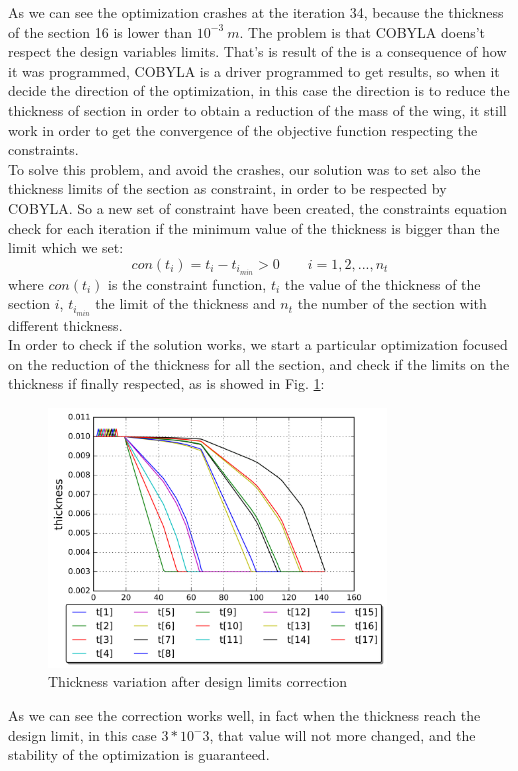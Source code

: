 As we can see the optimization crashes at the iteration 34, because the thickness of the section 16 is lower than $10^{-3}\ m$. The problem is that COBYLA doens't respect the design variables limits. That's is result of the is a consequence of how it was programmed, COBYLA is a driver programmed to get results, so when it decide the direction of the optimization, in this case the direction is to reduce the thickness of section in order to obtain a reduction of the mass of the wing, it still work in order to get the convergence of the objective function respecting the constraints. \\
To solve this problem, and avoid the crashes, our solution was to set also the thickness limits of the section as constraint, in order to be respected by COBYLA. So a new set of constraint have been created, the constraints equation check for each iteration if the minimum value of the thickness is bigger than the limit which we set:
\begin{equation*}
con(t_i)=t_i-t_{i_{min}} >0 \qquad i=1,2,...,n_t
\end{equation*}
where $con(t_i)$ is the constraint function, $t_i$ the value of the thickness of the section $i$, $t_{i_{min}}$ the limit of the thickness and $n_t$ the number of the section with different thickness.\\
In order to check if the solution works, we start a particular optimization focused on the reduction of the thickness for all the section, and check if the limits on the thickness if finally respected, as is showed in Fig. \ref{fig:5_10}:
 \begin{figure}[H]
	\centering
	\includegraphics[width = 0.8\textwidth]{./Immagini/5_11.png}
	\caption{Thickness variation after design limits correction}
	\label{fig:5_10}
\end{figure}
As we can see the correction works well, in fact when the thickness reach the design limit, in this case $3*10^-3$, that value will not more changed, and the stability of the optimization is guaranteed.
